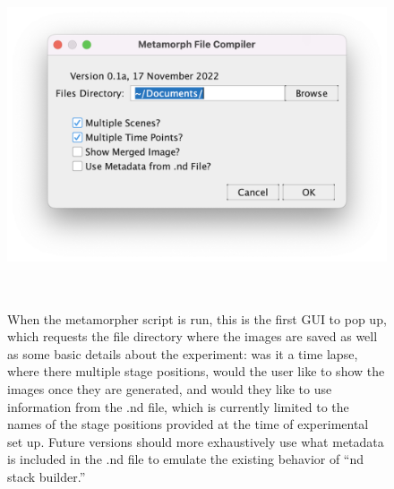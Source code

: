 \begin{figure}
\centering
\includegraphics[height=4in]{images/metamorphergui.png}
\caption[First part of the GUI for metamorpher, which allows for the compilation of multidimensional Metamorph images]{When the metamorpher script is run, this is the first GUI to pop up, which requests the file directory where the images are saved as well as some basic details about the experiment: was it a time lapse, where there multiple stage positions, would the user like to show the images once they are generated, and would they like to use information from the .nd file, which is currently limited to the names of the stage positions provided at the time of experimental set up. Future versions should more exhaustively use what metadata is included in the .nd file to emulate the existing behavior of ``nd stack builder.''}
\label{figure:metamorphergui}
\end{figure}

